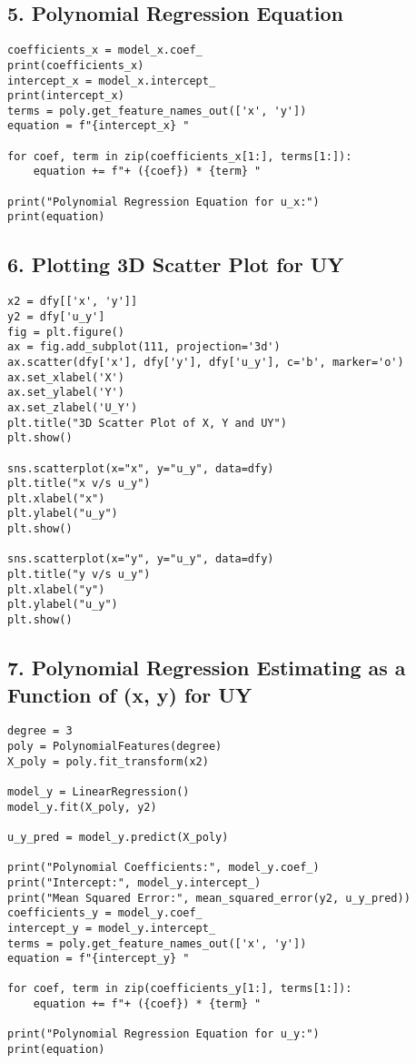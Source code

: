 \documentclass{article}
\begin{document}
\subsection*{5. Polynomial Regression Equation}
\begin{lstlisting}[style=python]
coefficients_x = model_x.coef_
print(coefficients_x)
intercept_x = model_x.intercept_
print(intercept_x)
terms = poly.get_feature_names_out(['x', 'y'])
equation = f"{intercept_x} "

for coef, term in zip(coefficients_x[1:], terms[1:]):
    equation += f"+ ({coef}) * {term} "

print("Polynomial Regression Equation for u_x:")
print(equation)
\end{lstlisting}

\subsection*{6. Plotting 3D Scatter Plot for UY}
\begin{lstlisting}[style=python]
x2 = dfy[['x', 'y']]
y2 = dfy['u_y']
fig = plt.figure()
ax = fig.add_subplot(111, projection='3d')
ax.scatter(dfy['x'], dfy['y'], dfy['u_y'], c='b', marker='o')
ax.set_xlabel('X')
ax.set_ylabel('Y')
ax.set_zlabel('U_Y')
plt.title("3D Scatter Plot of X, Y and UY")
plt.show()

sns.scatterplot(x="x", y="u_y", data=dfy)
plt.title("x v/s u_y")
plt.xlabel("x")
plt.ylabel("u_y")
plt.show()

sns.scatterplot(x="y", y="u_y", data=dfy)
plt.title("y v/s u_y")
plt.xlabel("y")
plt.ylabel("u_y")
plt.show()
\end{lstlisting}

\subsection*{7. Polynomial Regression Estimating as a Function of (x, y) for UY}
\begin{lstlisting}[style=python]
degree = 3
poly = PolynomialFeatures(degree)
X_poly = poly.fit_transform(x2)

model_y = LinearRegression()
model_y.fit(X_poly, y2)

u_y_pred = model_y.predict(X_poly)

print("Polynomial Coefficients:", model_y.coef_)
print("Intercept:", model_y.intercept_)
print("Mean Squared Error:", mean_squared_error(y2, u_y_pred))
coefficients_y = model_y.coef_
intercept_y = model_y.intercept_
terms = poly.get_feature_names_out(['x', 'y'])
equation = f"{intercept_y} "

for coef, term in zip(coefficients_y[1:], terms[1:]):
    equation += f"+ ({coef}) * {term} "

print("Polynomial Regression Equation for u_y:")
print(equation)
\end{lstlisting}
\end{document}

